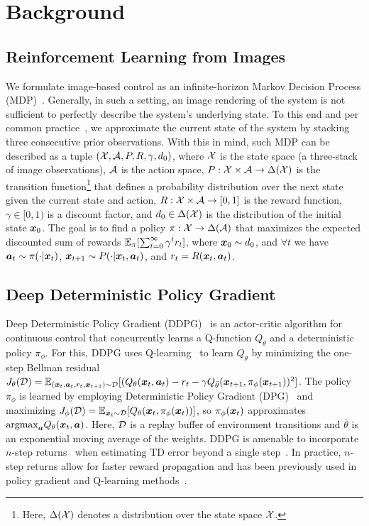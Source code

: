 \section{Background}

\subsection{Reinforcement Learning from Images} 
We formulate image-based control as an infinite-horizon Markov Decision Process (MDP)~\citep{bellman1957mdp}. Generally, in such a setting, an image rendering of the system is not sufficient to perfectly describe the system's underlying state. To this end and per common practice~\citep{mnih2013dqn}, we approximate the current state of the system by stacking three consecutive prior observations. With this in mind, such MDP can be described as a tuple $({\mathcal{X}}, {\mathcal{A}}, P, R, \gamma, d_0)$, where ${\mathcal{X}}$ is the state space (a three-stack of image observations), ${\mathcal{A}}$ is the action space, $P: {\mathcal{X}} \times {\mathcal{A}} \to \Delta({\mathcal{X}})$ is the transition function\footnote{Here, $\Delta({\mathcal{X}})$ denotes a distribution over the state space ${\mathcal{X}}$.} that defines a probability distribution over the next state given the current state and action, $R: {\mathcal{X}} \times {\mathcal{A}} \to [0,1]$ is the reward function, $\gamma \in [0, 1)$ is a discount factor, and $d_0 \in \Delta({\mathcal{X}})$ is the distribution of the initial state ${\bm{x}}_0$. The goal is to find a policy $\pi: {\mathcal{X}} \to \Delta({\mathcal{A}})$ that maximizes the expected discounted sum of rewards $\mathbb{E}_\pi[\sum_{t=0}^\infty \gamma^t r_t]$, where  ${\bm{x}}_0 \sim d_0$, and $\forall t$ we have ${\bm{a}}_{t} \sim \pi(\cdot|{\bm{x}}_{t})$, ${\bm{x}}_{t+1} \sim P(\cdot| {\bm{x}}_{t}, {\bm{a}}_{t})$, and $r_t = R({\bm{x}}_{t}, {\bm{a}}_{t})$.



\subsection{Deep Deterministic Policy Gradient}
Deep Deterministic Policy Gradient (DDPG)~\citep{lillicrap2015ddpg} is an actor-critic algorithm for continuous control that concurrently learns a Q-function $Q_\theta$ and a deterministic policy $\pi_\phi$. For this, DDPG uses Q-learning~\citep{watkins1992qlearning} to learn $Q_\theta$ by minimizing the one-step Bellman residual 
    $J_\theta({\mathcal{D}}) = \mathbb{E}_{\substack{( {\bm{x}}_t,{\bm{a}}_t, r_t, {\bm{x}}_{t+1}) \sim {\mathcal{D}} }}[(Q_\theta({\bm{x}}_t, {\bm{a}}_t) - r_t - \gamma Q_{\bar{\theta}}({\bm{x}}_{t+1},\pi_\phi({\bm{x}}_{t+1} ) )^2]$.
The policy $\pi_\phi$ is learned by employing Deterministic Policy Gradient (DPG)~\citep{silver14dpg} and maximizing $J_\phi({\mathcal{D}}) = \mathbb{E}_{{\bm{x}}_t \sim {\mathcal{D}}} [Q_\theta({\bm{x}}_t, \pi_\phi({\bm{x}}_t))]$, so $\pi_\phi({\bm{x}}_t)$ approximates $\mathrm{argmax}_{\bm{a}} Q_\theta({\bm{x}}_t, {\bm{a}})$.  Here, ${\mathcal{D}}$ is a replay buffer of environment transitions and $\bar{\theta}$ is an exponential moving average of the weights. DDPG is amenable to incorporate $n$-step returns~\citep{watkins1989phd,peng1996nstepq} when estimating TD error beyond a single step~\citep{barth-maron2018d4pg}. In practice, $n$-step returns allow for faster reward propagation and has been previously used in policy gradient and Q-learning methods~\citep{mnih2016asynchronous,barth-maron2018d4pg,hessel2017rainbow}.

